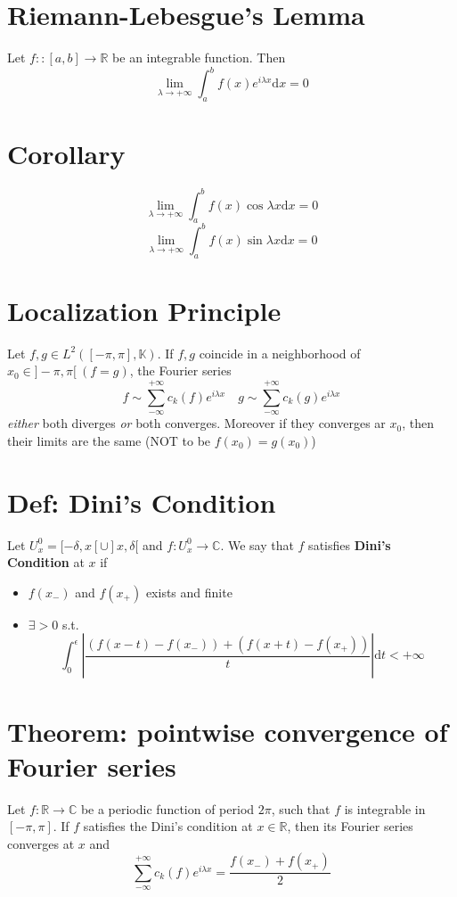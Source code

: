 \documentclass{book}
\newcommand{\abs}[1]{\left\lvert #1 \right\rvert}
\newcommand{\leftbracket}{[}
\newcommand{\rightbracket}{]}
\begin{document}
\section{Riemann-Lebesgue's Lemma}
\label{Riemann-Lebesgue's Lemma}
Let $f::[a,b]\rightarrow\mathbb{R}$ be an integrable function. Then $$\lim\limits_{\lambda\rightarrow+\infty}\int_a^bf(x)e^{i\lambda x}\text{d}x=0$$
\section{Corollary}
$$\lim\limits_{\lambda\rightarrow+\infty}\int_a^bf(x)\cos\lambda x\text{d}x=0$$
$$\lim\limits_{\lambda\rightarrow+\infty}\int_a^bf(x)\sin\lambda x\text{d}x=0$$
\section{Localization Principle}\label{Localization Principle}
Let $f,g\in L^2([-\pi,\pi],\mathbb{K})$. If $f,g$ coincide in a neighborhood of $x_0\in \rightbracket -\pi,\pi\leftbracket\ (f=g)$, the Fourier series $$f\sim\sum\limits_{-\infty}^{+\infty}c_k(f)e^{i\lambda x}\quad g\sim\sum\limits_{-\infty}^{+\infty} c_k(g)e^{i\lambda x}$$
\textit{either} both diverges \textit{or} both converges. Moreover if they converges ar $x_0$, then their limits are the same (NOT to be $f(x_0)=g(x_0)$)

\section{Def: Dini's Condition}\label{Dini's conditions}
Let $U_x^0=\leftbracket-\delta,x\leftbracket\cup\rightbracket x,\delta\leftbracket$ and $f:U_x^0\rightarrow \mathbb{C}$. We say that $f$ satisfies \textbf{Dini's Condition} at $x$ if \begin{itemize}
    \item $f(x_-)$ and $f(x_+)$ exists and finite
    \item $\exists>0$ s.t. $$\int_0^\epsilon\abs{\frac{(f(x-t)-f(x_-))+(f(x+t)-f(x_+))}t}\text{d}t<+\infty$$ 
\end{itemize}
\section{Theorem: pointwise convergence of Fourier series}
\label{Fourier convergence}
Let $f:\mathbb{R}\rightarrow\mathbb{C}$ be a periodic function of period $2\pi$, such that $f$ is integrable in $[-\pi,\pi]$. If $f$ satisfies the Dini's condition at $x\in \mathbb{R}$, then its Fourier series converges at $x$ and $$\sum\limits_{-\infty}^{+\infty}c_k(f)e^{i\lambda x}=\frac{f(x_-)+f(x_+)}{2}$$
\end{document}
